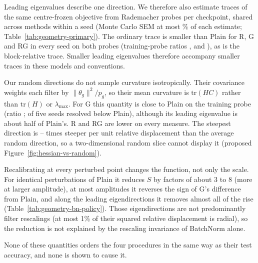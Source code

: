
Leading eigenvalues describe one direction. We therefore also estimate traces of the same centre-frozen objective from
\geoTraceDraws{} Rademacher probes per checkpoint, shared across methods within a seed (Monte Carlo SEM at most
\geoTraceSemMaxPct\% of each estimate; Table~\ref{tab:geometry-primary}). The ordinary trace is smaller than Plain for R, G and RG
in every seed on both probes (training-probe ratios \geoRTrainTrRatio, \geoGTrainTrRatio{} and \geoRGTrainTrRatio), as is the
block-relative trace. Smaller leading eigenvalues therefore accompany smaller traces in these models and conventions.

Our random directions do not sample curvature isotropically. Their covariance weights each filter by
$\|\theta_g\|^2/p_g$, so their mean curvature is $\mathrm{tr}(HC)$ rather than $\mathrm{tr}(H)$ or $\lambda_{\max}$. For G this
quantity is close to Plain on the training probe (ratio \geoGTrainTrCovRatio; \geoGTrainTrCovBelow{} of five seeds resolved below
Plain), although its leading eigenvalue is about half of Plain's. R and RG are lower on every measure. The steepest direction
is \geoExtremeOverRandomMin--\geoExtremeOverRandomMax{} times steeper per unit relative displacement than the average random
direction, so a two-dimensional random slice cannot display it (proposed Figure~\ref{fig:hessian-vs-random}).

Recalibrating at every perturbed point changes the function, not only the scale. For identical perturbations of Plain it
reduces $S$ by factors of about 3 to 8 (more at larger amplitude), at most amplitudes it reverses the sign of G's difference from Plain, and
along the leading eigendirections it removes almost all of the rise (Table~\ref{tab:geometry-bn-policy}). Those
eigendirections are not predominantly filter rescalings (at most 1\% of their squared relative displacement is radial), so the
reduction is not explained by the rescaling invariance of BatchNorm alone.

None of these quantities orders the four procedures in the same way as their test accuracy, and none is shown to cause it.
